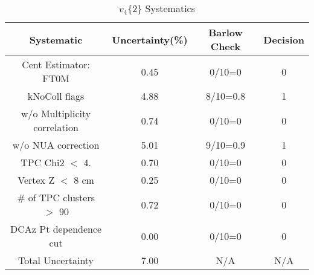 \begin{table}[htbp]
\caption{$v_4\{2\}$ Systematics}
\label{tab:Sys_v42}
\centering
\begin{tabular}{|c|c|c|c|}
\hline
Systematic & Uncertainty(\%) & Barlow Check & Decision \\
\hline
Cent Estimator: FT0M & 0.45 & 0/10=0 & 0 \\
kNoColl flags & 4.88 & 8/10=0.8 & 1 \\
w/o Multiplicity correlation & 0.74 & 0/10=0 & 0 \\
w/o NUA correction & 5.01 & 9/10=0.9 & 1 \\
TPC Chi2 $<$ 4. & 0.70 & 0/10=0 & 0 \\
Vertex Z $<$ 8 cm & 0.25 & 0/10=0 & 0 \\
\# of TPC clusters $>$ 90 & 0.72 & 0/10=0 & 0 \\
DCAz Pt dependence cut & 0.00 & 0/10=0 & 0 \\
\hline
Total Uncertainty & 7.00 & N/A & N/A \\
\hline
\end{tabular}
\end{table}
